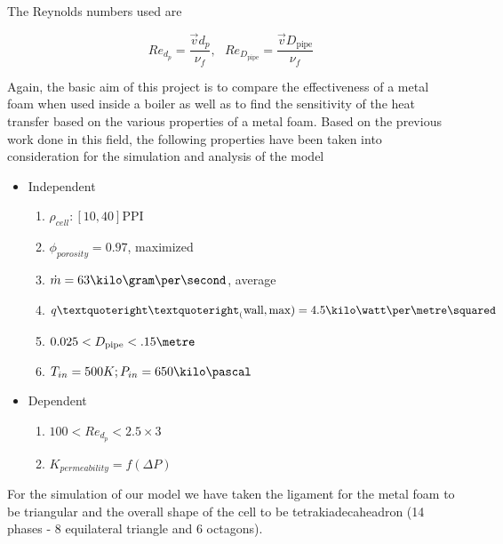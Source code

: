 \documentclass[compileTAMUreport.tex]{subfiles}
\begin{document}
The Reynolds numbers used are

\begin{equation}
Re_{d_{p}} = \frac{\vec{v} d_p}{\nu_f}, ~~~ Re_{D_{\mathrm{pipe}}} = \frac{\vec{v} D_{\mathrm{pipe}}}{\nu_f}
\end{equation}

Again, the basic aim of this project is to compare the effectiveness of a metal foam when used inside a boiler as well as to find the sensitivity of the heat transfer based on the various properties of a metal foam. Based on the previous work done in this field, the following properties have been taken into consideration for the simulation and analysis of the model


\begin{itemize}
	\item Independent
		\begin{enumerate}
			\item $\rho_{cell} : [10,40] \mathrm{PPI}$
			\item $\phi_{porosity}= 0.97$, maximized
			\item $\dot{m} =63 \kilo\gram\per\second$, average
			\item $ q’’_(\mathrm{wall,max})=4.5 \kilo\watt\per\metre\squared$
			\item $ 0.025 < D_{\mathrm{pipe}} < .15 \metre$
			\item $ T_{in}=500K;P_{in} = 650 \kilo\pascal $
		\end{enumerate}
	\item Dependent
		\begin{enumerate}
			\item $100 < Re_{d_p} < 2.5 \times 3$
			\item $K_{permeability}= f(\Delta P)$
		\end{enumerate}
\end{itemize}

For the simulation of our model we have taken the ligament for the metal foam to be triangular and the overall shape of the cell to be tetrakiadecaheadron (14 phases - 8 equilateral triangle and 6 octagons).\cite{Boomsma2011}
\end{document}
